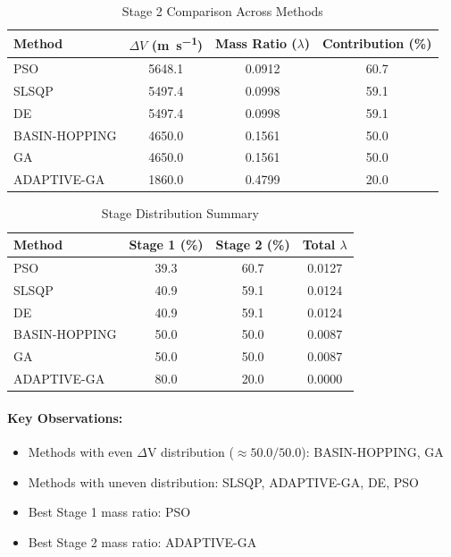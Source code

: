 \documentclass{article}
\begin{document}
\begin{table}[H]
\centering
\caption{Stage 2 Comparison Across Methods}
\begin{tabular}{lS[table-format=4.1]S[table-format=1.4]S[table-format=3.1]}
\toprule
Method & {$\Delta V$ (\si{\meter\per\second})} & {Mass Ratio ($\lambda$)} & {Contribution (\%)} \\
\midrule
PSO          & 5648.1 & 0.0912 & 60.7 \\
SLSQP        & 5497.4 & 0.0998 & 59.1 \\
DE           & 5497.4 & 0.0998 & 59.1 \\
BASIN-HOPPING & 4650.0 & 0.1561 & 50.0 \\
GA           & 4650.0 & 0.1561 & 50.0 \\
ADAPTIVE-GA  & 1860.0 & 0.4799 & 20.0 \\
\bottomrule
\end{tabular}
\end{table}

\begin{table}[H]
\centering
\caption{Stage Distribution Summary}
\begin{tabular}{lS[table-format=4.1]S[table-format=4.1]S[table-format=1.4]}
\toprule
Method & {Stage 1 (\%)} & {Stage 2 (\%)} & {Total $\lambda$} \\
\midrule
PSO          & 39.3 & 60.7 & 0.0127 \\
SLSQP        & 40.9 & 59.1 & 0.0124 \\
DE           & 40.9 & 59.1 & 0.0124 \\
BASIN-HOPPING & 50.0 & 50.0 & 0.0087 \\
GA           & 50.0 & 50.0 & 0.0087 \\
ADAPTIVE-GA  & 80.0 & 20.0 & 0.0000 \\
\bottomrule
\end{tabular}
\end{table}

\paragraph{Key Observations:}
\begin{itemize}
\item Methods with even $\Delta$V distribution ($\approx50.0/50.0$): BASIN-HOPPING, GA
\item Methods with uneven distribution: SLSQP, ADAPTIVE-GA, DE, PSO
\item Best Stage 1 mass ratio: PSO
\item Best Stage 2 mass ratio: ADAPTIVE-GA
\end{itemize}
\end{document}
